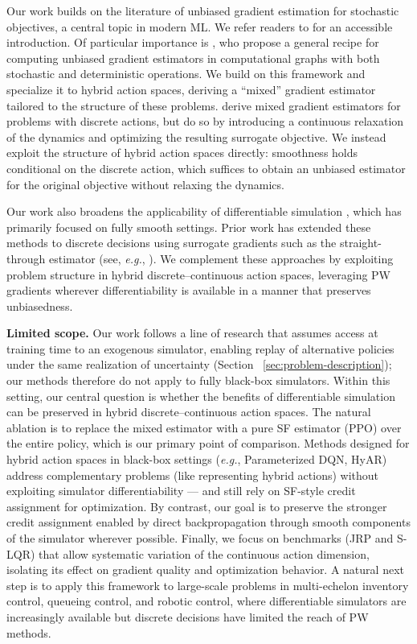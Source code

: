 \documentclass{article}
\theoremstyle{definition}
\theoremstyle{remark}
\newcommand{\eg}{{\em e.g.\/}, }
\begin{document}
Our work builds on the literature of unbiased gradient estimation for stochastic objectives, a central topic in modern ML. We refer readers to \citet{mohamed2020monte} for an accessible introduction. Of particular importance is \citet{schulman2015gradient}, who propose a general recipe for computing unbiased gradient estimators in computational graphs with both stochastic and deterministic operations. We build on this framework and specialize it to hybrid action spaces, deriving a ``mixed'' gradient estimator tailored to the structure of these problems.
\citet{levy2018deterministic} derive mixed gradient estimators for problems with discrete actions, but do so by introducing a continuous relaxation of the dynamics and optimizing the resulting surrogate objective. We instead exploit the structure of hybrid action spaces directly: smoothness holds conditional on the discrete action, which suffices to obtain an unbiased estimator for the original objective without relaxing the dynamics.

Our work also broadens the applicability of differentiable simulation 
\citep{hu2019difftaichi, alvo2023deep, madeka2022deep}, which has primarily 
focused on fully smooth settings. Prior work has extended these methods 
to discrete decisions using surrogate gradients such as the straight-through 
estimator \citep{bengio2013estimating} (see, \eg \cite{che2024differentiable}). 
We complement these approaches by exploiting problem structure in hybrid 
discrete--continuous action spaces, leveraging PW gradients wherever 
differentiability is available in a manner that preserves unbiasedness.

{\bf Limited scope.}
Our work follows a line of research that assumes access at training time to an exogenous simulator, enabling replay of alternative policies under the same realization of uncertainty (Section ~\ref{sec:problem-description}); our methods therefore do not apply to fully black-box simulators. Within this setting, our central question is whether the benefits of differentiable simulation can be preserved in hybrid discrete–continuous action spaces. The natural ablation is to replace the mixed estimator with a pure SF estimator (PPO) over the entire policy, which is our primary point of comparison. Methods designed for hybrid action spaces in black-box settings (\eg Parameterized DQN, HyAR) address complementary problems (like representing hybrid actions) without exploiting simulator differentiability — and still rely on SF-style credit assignment for optimization. By contrast, our goal is to preserve the stronger credit assignment enabled by direct backpropagation through smooth components of the simulator wherever possible. Finally, we focus on benchmarks (JRP and  S-LQR) that allow systematic variation of the continuous action dimension, isolating its effect on gradient quality and optimization behavior. A natural next step is to apply this framework to large-scale problems in multi-echelon inventory control, queueing control, and robotic control, where differentiable simulators are increasingly available but discrete decisions have limited the reach of PW methods.
\end{document}
